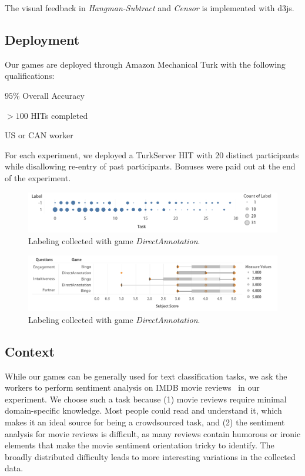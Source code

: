 \documentclass[chi_draft]{sigchi}
\begin{document}
The visual feedback in \emph{Hangman-Subtract} and \emph{Censor} is implemented with d3js.

\subsection{Deployment}
Our games are deployed through Amazon Mechanical Turk with the following qualifications:
\begin{compactitem}
\item $95\%$ Overall Accuracy
\item $> 100$ HITs completed
\item US or CAN worker
\end{compactitem}

For each experiment, we deployed a TurkServer HIT with 20 distinct participants while disallowing  re-entry of past participants. Bonuses were paid out at the end of the experiment. 

\begin{figure}[t]
\includegraphics[width=\linewidth]{figures/direct-label.pdf}
\caption{Labeling collected with game \emph{DirectAnnotation}.}
\label{fig:direct-label}
\end{figure}


\begin{figure}[t]
\includegraphics[width=\linewidth]{figures/interview.pdf}
\caption{Labeling collected with game \emph{DirectAnnotation}.}
\label{fig:interview}
\end{figure}

\subsection{Context} 
While our games can be generally used for text classification tasks, we ask the workers to perform sentiment analysis on IMDB movie reviews~\cite{alsallakh2014visual} in our experiment. 
We choose such a task because 
(1) movie reviews require minimal domain-specific knowledge. Most people could read and understand it, which makes it an ideal source for being a crowdsourced task, and
(2) the sentiment analysis for movie reviews is difficult, as many reviews contain humorous or ironic elements that make the movie sentiment orientation tricky to identify. The broadly distributed difficulty leads to more interesting variations in the collected data.
\end{document}
